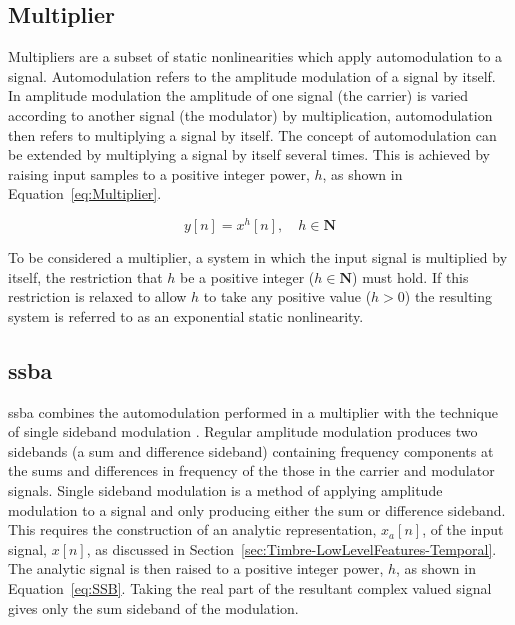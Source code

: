 	\subsection{Multiplier}
	\label{sec:Excitation-Methods-Multiplier}
		Multipliers are a subset of static nonlinearities which apply automodulation to a signal. Automodulation
		refers to the amplitude modulation of a signal by itself. In amplitude modulation the amplitude of one
		signal (the carrier) is varied according to another signal (the modulator) by multiplication,
		automodulation then refers to multiplying a signal by itself. The concept of automodulation can be extended
		by multiplying a signal by itself several times. This is achieved by raising input samples to a positive
		integer power, $h$, as shown in Equation~\ref{eq:Multiplier}.

		\begin{equation}
			y[n] = x^{h}[n], \quad h \in \textbf{N}
			\label{eq:Multiplier}
		\end{equation}

		To be considered a multiplier, a system in which the input signal is multiplied by itself, the restriction
		that $h$ be a positive integer ($h \in \textbf{N}$) must hold. If this restriction is relaxed to allow $h$
		to take any positive value ($h > 0$) the resulting system is referred to as an exponential static
		nonlinearity.

	\subsection{\acrlong{ssba}}
	\label{sec:Excitation-Methods-SSBA}
		\acrfull{ssba} combines the automodulation performed in a multiplier with the technique of single sideband
		modulation \citep{corinthios2009signals}. Regular amplitude modulation produces two sidebands (a sum and
		difference sideband) containing frequency components at the sums and differences in frequency of the those
		in the carrier and modulator signals. Single sideband modulation is a method of applying amplitude
		modulation to a signal and only producing either the sum or difference sideband. This requires the
		construction of an analytic representation, $x_{a}[n]$, of the input signal, $x[n]$, as discussed in
		Section~\ref{sec:Timbre-LowLevelFeatures-Temporal}. The analytic signal is then raised to a positive
		integer power, $h$, as shown in Equation~\ref{eq:SSB}. Taking the real part of the resultant complex valued
		signal gives only the sum sideband of the modulation.

